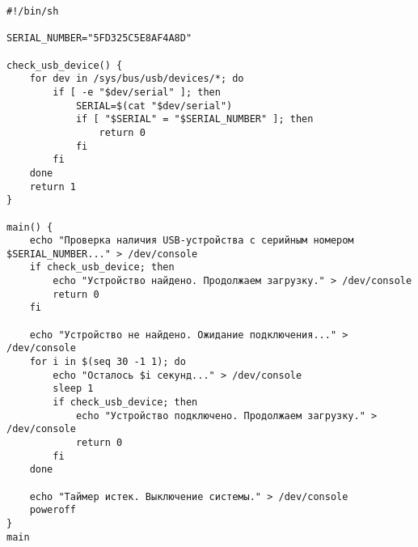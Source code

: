 \documentclass[12pt]{article}
\begin{document}
\begin{verbatim}
#!/bin/sh

SERIAL_NUMBER="5FD325C5E8AF4A8D"

check_usb_device() {
    for dev in /sys/bus/usb/devices/*; do
        if [ -e "$dev/serial" ]; then
            SERIAL=$(cat "$dev/serial")
            if [ "$SERIAL" = "$SERIAL_NUMBER" ]; then
                return 0
            fi
        fi
    done
    return 1
}

main() {
    echo "Проверка наличия USB-устройства с серийным номером $SERIAL_NUMBER..." > /dev/console
    if check_usb_device; then
        echo "Устройство найдено. Продолжаем загрузку." > /dev/console
        return 0
    fi

    echo "Устройство не найдено. Ожидание подключения..." > /dev/console
    for i in $(seq 30 -1 1); do
        echo "Осталось $i секунд..." > /dev/console
        sleep 1
        if check_usb_device; then
            echo "Устройство подключено. Продолжаем загрузку." > /dev/console
            return 0
        fi
    done

    echo "Таймер истек. Выключение системы." > /dev/console
    poweroff
}
main
\end{verbatim}
\end{document}
